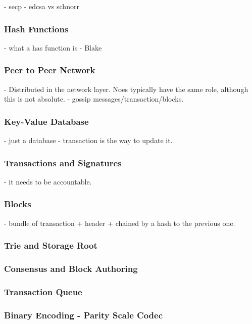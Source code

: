 - secp
- edcsa vs schnorr

\subsubsection{Hash Functions}

- what a has function is
- Blake

\subsubsection{Peer to Peer Network}

- Distributed in the network layer. Noes typically have the same role, although this is not
absolute.
- gossip messages/transaction/blocks.

\subsubsection{Key-Value Database}

- just a database
- transaction is the way to update it.

\subsubsection{Transactions and Signatures}

- it needs to be accountable.

\subsubsection{Blocks}

- bundle of transaction + header + chained by a hash to the previous one.

\subsubsection{Trie and Storage Root}

\subsubsection{Consensus and Block Authoring}

\subsubsection{Transaction Queue}

\subsubsection{Binary Encoding - Parity Scale Codec}


